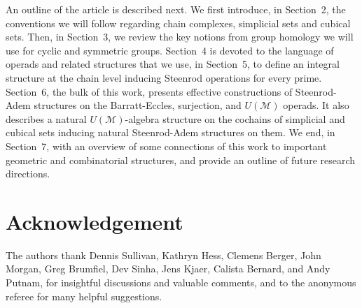 An outline of the article is described next.
We first introduce, in Section~2, the conventions we will follow regarding chain complexes, simplicial sets and cubical sets.
Then, in Section~3, we review the key notions from group homology we will use for cyclic and symmetric groups. Section~4 is devoted to the language of operads and related structures that we use, in Section~5, to define an integral structure at the chain level inducing Steenrod operations for every prime. Section~6, the bulk of this work, presents effective constructions of Steenrod-Adem structures on the Barratt-Eccles, surjection, and $U(\mathcal M)$ operads.
It also describes a natural $U(\mathcal M)$-algebra structure on the cochains of simplicial and cubical sets inducing natural Steenrod-Adem structures on them.
We end, in Section~7, with an overview of some connections of this work to important geometric and combinatorial structures, and provide an outline of future research directions.

\section*{Acknowledgement}

The authors thank Dennis Sullivan, Kathryn Hess, Clemens Berger, John Morgan, Greg Brumfiel, Dev Sinha, Jens Kjaer, Calista Bernard, and Andy Putnam, for insightful discussions and valuable comments, and to the anonymous referee for many helpful suggestions.